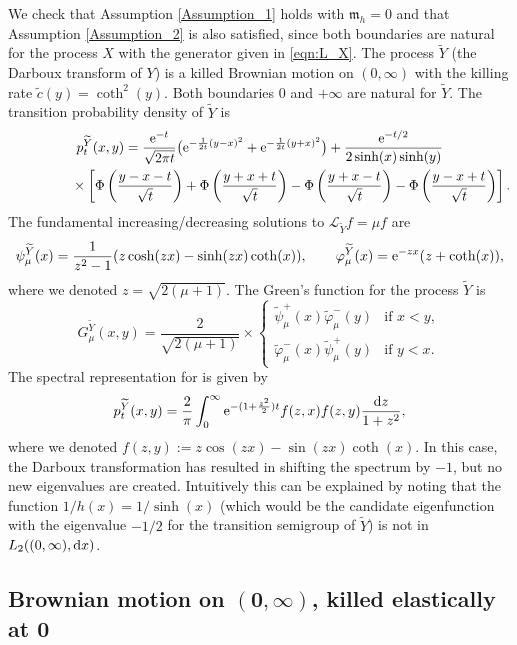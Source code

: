 \documentclass[10pt,a4paper]{amsart}
\numberwithin{equation}{section}
\theoremstyle{definition}
\def\L{{\mathcal L}}
\def\d{{\textnormal d}}
\begin{document}
We check that Assumption \ref{Assumption_1} holds with ${\mathfrak m}_h=0$ and that Assumption \ref{Assumption_2} is also satisfied, since both boundaries are natural for the process $X$ with the generator given in \eqref{eqn:L_X}. The process $\widetilde Y$ (the Darboux transform of $Y$) is a killed Brownian motion on $(0,\infty)$ with the killing rate $\tilde c(y)=\coth^{2}(y)$. Both boundaries $0$ and $+\infty$ are natural for $\widetilde Y$. The transition probability density of $\widetilde Y$ is
\begin{gather*}
p_t^{\widetilde Y}(x,y)=\frac{{\rm e}^{-t}}{\sqrt{2\pi t}} \bigl({\rm e}^{-\frac{1}{2t}(y-x)^2}+{\rm e}^{-\frac{1}{2t}(y+x)^2}\bigr) + \frac{{\rm e}^{-t/2}}{2\sinh(x) \sinh(y)} \\
\hphantom{p_t^{\widetilde Y}(x,y)=}{}\times\left[
\Phi\left( \frac{y-x-t}{\sqrt{t}} \right) + \Phi\left( \frac{y+x+t}{\sqrt{t}} \right)
-\Phi\left( \frac{y+x-t}{\sqrt{t}} \right)-\Phi\left( \frac{y-x+t}{\sqrt{t}} \right)\right].
\end{gather*}
The fundamental increasing/decreasing solutions to $\L_{\widetilde Y} f = \mu f$ are
\[
 \psi^{\widetilde Y}_{\mu}(x)=\frac{1}{z^2-1} ( z \cosh(zx) - \sinh(zx) \coth(x)), \qquad
 \varphi^{\widetilde Y}_{\mu}(x)={\rm e}^{-zx} (z+\coth(x)),
\]
where we denoted $z=\sqrt{2(\mu+1)}$. The Green's function for the process $\tilde Y$ is
\[
G^{\widetilde Y}_{\mu}(x,y)=\frac{2}{\sqrt{2(\mu+1)}} \times
\begin{cases}
\tilde \psi^+_{\mu}(x) \tilde \varphi^-_{\mu}(y) &\text{if }  x<y,\\
\tilde \varphi^-_{\mu}(x)\tilde \psi^+_{\mu}(y)  &\text{if }  y<x.
\end{cases}
\]
The spectral representation for  is given by
\begin{equation}\label{tilde_p_spectral2}
p^{\widetilde Y}_t(x,y)=\frac{2}{\pi} \int_0^{\infty} {\rm e}^{-(1+\frac{z^2}{2}) t}
f(z,x) f(z,y) \frac{\d z}{1+z^2},
\end{equation}
where we denoted $f(z,y):=z \cos(zx)-\sin(zx) \coth(x)$. In this case, the Darboux transformation has resulted in shifting the spectrum by $-1$, but no new eigenvalues are created. Intuitively this can be explained by noting that the function $1/h(x)=1/\sinh(x)$ (which would be the candidate eigenfunction with the eigenvalue $-1/2$ for the transition semigroup of $\tilde Y$) is not in~${L_2((0,\infty),\d x)}$.

\subsection[Brownian motion on (0,infty), killed elastically at 0]{Brownian motion on $\boldsymbol{(0,\infty)}$, killed elastically at $\boldsymbol{0}$}\label{example3}
\end{document}
